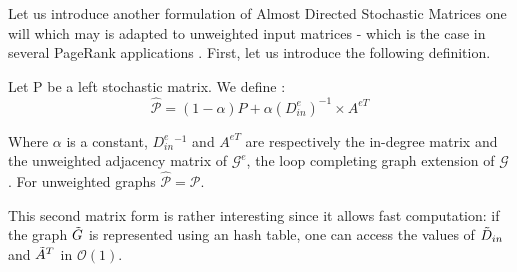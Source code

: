 Let us introduce another formulation of Almost Directed Stochastic Matrices one will which may is adapted to unweighted input matrices - which is the case in several PageRank applications \cite{gleich_2015}. First, let us introduce the following definition.

\begin{definition}\label{def:ADSM2}
Let P be a left stochastic matrix. We define : 
\begin{equation}
    \hat{\mathcal{P}} = (1-\alpha) P + \alpha (D^e_{in})^{-1} \times A^{eT}
\end{equation}

Where $\alpha$ is a constant, $D^e_{in}^{-1}$ and $A^{eT}$ are respectively the in-degree matrix and the unweighted adjacency matrix of $\mathcal{G}^e$, the loop completing graph extension of $\mathcal{G}$.
For unweighted graphs $\hat{\mathcal{P}} = \mathcal{P}$.

\end{definition}


This second matrix form is rather interesting since it allows fast computation: if the graph $\Tilde{G}$ is represented using an hash table, one can access the values of $\Tilde{D}_{in}$ and $\Tilde{A}^T$ in $\mathcal{O}(1)$.
